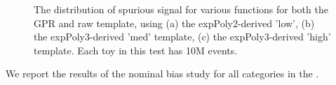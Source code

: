 \begin{figure} 
\begin{center}

\caption{The distribution of spurious signal for various functions for both the GPR and raw template, using (a) the expPoly2-derived 'low', (b) the expPoly3-derived 'med' template, (c) the expPoly3-derived 'high' template. Each toy in this test has 10M events.}
\label{fig:lowpt_10M_noSig}
\end{center}
\end{figure}

We report the results of the nominal bias study for all categories in the \Tab{\ref{tab:NoSigSS}}.

